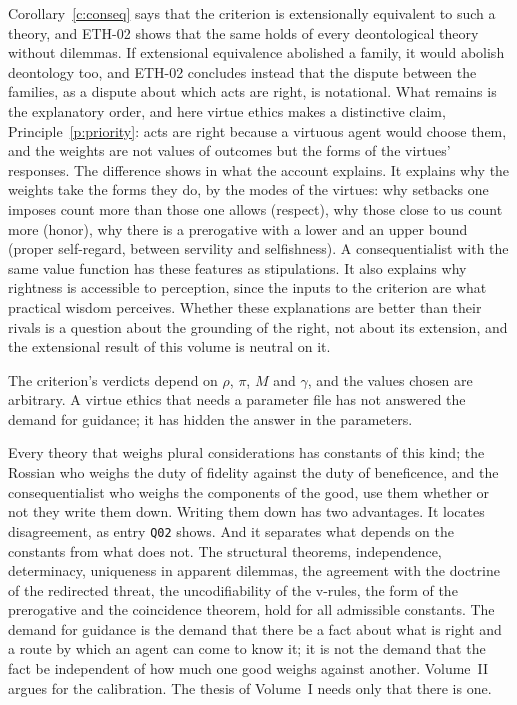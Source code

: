 \documentclass{situationist-preprint}
\begin{document}
\begin{reply}
Corollary~\ref{c:conseq} says that the criterion is extensionally equivalent to such a theory, and ETH-02 shows that the same holds of every deontological theory without dilemmas. If extensional equivalence abolished a family, it would abolish deontology too, and ETH-02 concludes instead that the dispute between the families, as a dispute about which acts are right, is notational. What remains is the explanatory order, and here virtue ethics makes a distinctive claim, Principle~\ref{p:priority}: acts are right because a virtuous agent would choose them, and the weights are not values of outcomes but the forms of the virtues' responses. The difference shows in what the account explains. It explains why the weights take the forms they do, by the modes of the virtues: why setbacks one imposes count more than those one allows (respect), why those close to us count more (honor), why there is a prerogative with a lower and an upper bound (proper self-regard, between servility and selfishness). A consequentialist with the same value function has these features as stipulations. It also explains why rightness is accessible to perception, since the inputs to the criterion are what practical wisdom perceives. Whether these explanations are better than their rivals is a question about the grounding of the right, not about its extension, and the extensional result of this volume is neutral on it.
\end{reply}

\begin{objection}\label{o:constants}
The criterion's verdicts depend on $\rho$, $\pi$, $M$ and $\gamma$, and the values chosen are arbitrary. A virtue ethics that needs a parameter file has not answered the demand for guidance; it has hidden the answer in the parameters.
\end{objection}

\begin{reply}
Every theory that weighs plural considerations has constants of this kind; the Rossian who weighs the duty of fidelity against the duty of beneficence, and the consequentialist who weighs the components of the good, use them whether or not they write them down. Writing them down has two advantages. It locates disagreement, as entry \texttt{Q02} shows. And it separates what depends on the constants from what does not. The structural theorems, independence, determinacy, uniqueness in apparent dilemmas, the agreement with the doctrine of the redirected threat, the uncodifiability of the v-rules, the form of the prerogative and the coincidence theorem, hold for all admissible constants. The demand for guidance is the demand that there be a fact about what is right and a route by which an agent can come to know it; it is not the demand that the fact be independent of how much one good weighs against another. Volume~II argues for the calibration. The thesis of Volume~I needs only that there is one.
\end{reply}
\end{document}
